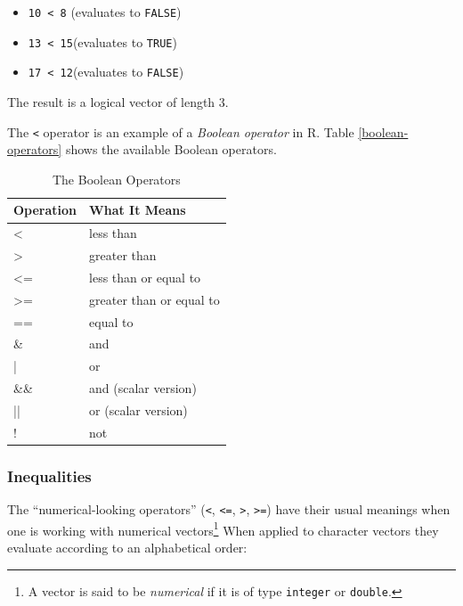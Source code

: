 \documentclass[]{book}
\providecommand{\tightlist}{%
  \setlength{\itemsep}{0pt}\setlength{\parskip}{0pt}}
\let\rmarkdownfootnote\footnote%
\def\footnote{\protect\rmarkdownfootnote}
\theoremstyle{definition}
\theoremstyle{definition}
\theoremstyle{remark}
\begin{document}
\begin{itemize}
\tightlist
\item
  \texttt{10\ \textless{}\ 8} (evaluates to \texttt{FALSE})
\item
  \texttt{13\ \textless{}\ 15}(evaluates to \texttt{TRUE})
\item
  \texttt{17\ \textless{}\ 12}(evaluates to \texttt{FALSE})
\end{itemize}

The result is a logical vector of length 3.

The \texttt{\textless{}} operator is an example of a \emph{Boolean
operator} in R. Table \ref{boolean-operators} shows the available
Boolean operators. 
 
 

\begin{table}

\caption{\label{tab:unnamed-chunk-101}The Boolean Operators}
\centering
\begin{tabular}[t]{l|l}
\hline
Operation & What It Means\\
\hline
< & less than\\
\hline
> & greater than\\
\hline
<= & less than or equal to\\
\hline
>= & greater than or equal to\\
\hline
== & equal to\\
\hline
\& & and\\
\hline
| & or\\
\hline
\&\& & and (scalar version)\\
\hline
|| & or (scalar version)\\
\hline
! & not\\
\hline
\end{tabular}
\end{table}

\subsubsection{Inequalities}\label{inequalities}

The ``numerical-looking operators'' (\texttt{\textless{}},
\texttt{\textless{}=}, \texttt{\textgreater{}},
\texttt{\textgreater{}=}) have their usual meanings when one is working
with numerical vectors\footnote{A vector is said to be \emph{numerical}
  if it is of type \texttt{integer} or \texttt{double}.} When applied to
character vectors they evaluate according to an alphabetical order:
\end{document}
